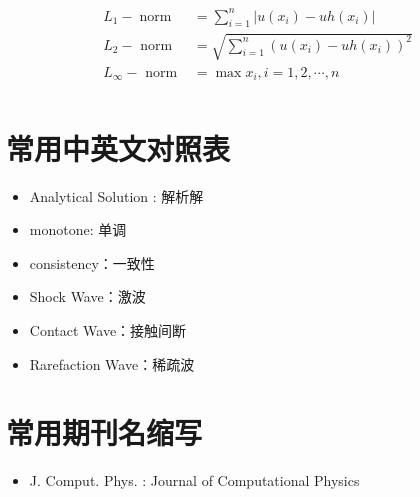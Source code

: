 \documentclass{book}
\begin{document}
\begin{equation}
    \begin{aligned}
        L_{1}-\operatorname{norm} & =\sum_{i=1}^{n}\left|u\left(x_{i}\right)-u h\left(x_{i}\right)\right|            \\
        L_{2}-\text { norm }      & =\sqrt{\sum_{i=1}^{n}\left(u\left(x_{i}\right)-u h\left(x_{i}\right)\right)^{2}} \\
        L_{\infty}-\text { norm } & =\max x_i,i=1,2,\cdots,n                                                         \\
    \end{aligned}
\end{equation}
\section{常用中英文对照表}
\begin{itemize}
    \item Analytical Solution : 解析解
    \item monotone: 单调
    \item consistency：一致性
    \item Shock Wave：激波
    \item Contact Wave：接触间断
    \item Rarefaction Wave：稀疏波
\end{itemize}
\section{常用期刊名缩写}
\begin{itemize}
    \item J. Comput. Phys. : Journal of Computational Physics
\end{itemize}
\end{document}
